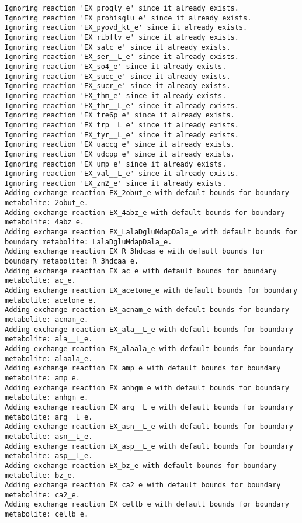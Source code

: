 \documentclass[
  letterpaper,
  DIV=11,
  numbers=noendperiod]{scrartcl}
\begin{document}
\begin{verbatim}
Ignoring reaction 'EX_progly_e' since it already exists.
Ignoring reaction 'EX_prohisglu_e' since it already exists.
Ignoring reaction 'EX_pyovd_kt_e' since it already exists.
Ignoring reaction 'EX_ribflv_e' since it already exists.
Ignoring reaction 'EX_salc_e' since it already exists.
Ignoring reaction 'EX_ser__L_e' since it already exists.
Ignoring reaction 'EX_so4_e' since it already exists.
Ignoring reaction 'EX_succ_e' since it already exists.
Ignoring reaction 'EX_sucr_e' since it already exists.
Ignoring reaction 'EX_thm_e' since it already exists.
Ignoring reaction 'EX_thr__L_e' since it already exists.
Ignoring reaction 'EX_tre6p_e' since it already exists.
Ignoring reaction 'EX_trp__L_e' since it already exists.
Ignoring reaction 'EX_tyr__L_e' since it already exists.
Ignoring reaction 'EX_uaccg_e' since it already exists.
Ignoring reaction 'EX_udcpp_e' since it already exists.
Ignoring reaction 'EX_ump_e' since it already exists.
Ignoring reaction 'EX_val__L_e' since it already exists.
Ignoring reaction 'EX_zn2_e' since it already exists.
Adding exchange reaction EX_2obut_e with default bounds for boundary metabolite: 2obut_e.
Adding exchange reaction EX_4abz_e with default bounds for boundary metabolite: 4abz_e.
Adding exchange reaction EX_LalaDgluMdapDala_e with default bounds for boundary metabolite: LalaDgluMdapDala_e.
Adding exchange reaction EX_R_3hdcaa_e with default bounds for boundary metabolite: R_3hdcaa_e.
Adding exchange reaction EX_ac_e with default bounds for boundary metabolite: ac_e.
Adding exchange reaction EX_acetone_e with default bounds for boundary metabolite: acetone_e.
Adding exchange reaction EX_acnam_e with default bounds for boundary metabolite: acnam_e.
Adding exchange reaction EX_ala__L_e with default bounds for boundary metabolite: ala__L_e.
Adding exchange reaction EX_alaala_e with default bounds for boundary metabolite: alaala_e.
Adding exchange reaction EX_amp_e with default bounds for boundary metabolite: amp_e.
Adding exchange reaction EX_anhgm_e with default bounds for boundary metabolite: anhgm_e.
Adding exchange reaction EX_arg__L_e with default bounds for boundary metabolite: arg__L_e.
Adding exchange reaction EX_asn__L_e with default bounds for boundary metabolite: asn__L_e.
Adding exchange reaction EX_asp__L_e with default bounds for boundary metabolite: asp__L_e.
Adding exchange reaction EX_bz_e with default bounds for boundary metabolite: bz_e.
Adding exchange reaction EX_ca2_e with default bounds for boundary metabolite: ca2_e.
Adding exchange reaction EX_cellb_e with default bounds for boundary metabolite: cellb_e.

\end{verbatim}
\end{document}
